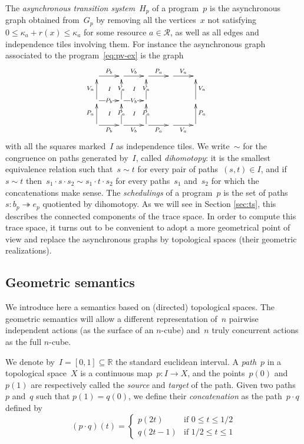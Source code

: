 \documentclass[orivec]{llncs} \usepackage[T1]{fontenc}
\newcommand{\resources}{\mathcal{R}}
\newcommand{\R}{\mathbb{R}}
\renewcommand{\P}[1]{P_{#1}}
\newcommand{\V}[1]{V_{#1}}
\newcommand{\vxym}[1]{\vcenter{\xymatrix{#1}}}
\newcommand{\capacity}[1]{\kappa_{#1}}
\newcommand{\transitionpath}[1]{\overset{#1}\twoheadrightarrow}
\renewcommand{\leq}{\leqslant}
\begin{document}
{The \emph{asynchronous transition system}~$H_p$ of a program~$p$ is the
asynchronous graph obtained from~$G_p$ by removing all the vertices~$x$ not
satisfying \hbox{$0\leq\capacity a+r(x)\leq\capacity a$} for some resource
$a\in\resources$, as well as all edges and independence tiles involving
them. For instance the asynchronous graph associated to the
program~\eqref{eq:pv-ex} is the graph
\[
\vxym{
  \ar[r]^{\P b}\ar@{}[dr]|-{I}&\ar[r]^{\V b}\ar@{}[dr]|-{I}&\ar[r]^{\P a}&\ar[r]^{\V a}&\\
  \ar[u]^{\V a}\ar[r]|{\P b}\ar@{}[dr]|-{I}&\ar[u]|{\V a}\ar[r]|{\V b}\ar@{}[dr]|-{I}&\ar[u]|{\V a}&&\ar[u]_{\V a}&\\
  \ar[u]^{\P a}\ar[r]_{\P b}&\ar[r]_{\V b}\ar[u]|{\P a}&\ar[r]_{\P a}\ar[u]|{\P a}&\ar[r]_{\V a}&\ar[u]_{\P a}&\\
}
\]
with all the squares marked~$I$ as independence tiles. We write~$\sim$ for the
congruence on paths generated by~$I$, called \emph{dihomotopy}: it is the
smallest equivalence relation such that~$s\sim t$ for every pair of
paths~$(s,t)\in I$, and if~$s\sim t$ then~$s_1\cdot s\cdot s_2 \sim s_1\cdot
t\cdot s_2$ for every paths~$s_1$ and~$s_2$ for which the concatenations make
sense. The \emph{schedulings} of a program~$p$ is the set of
paths~$s:b_p\transitionpath{}e_p$ quotiented by dihomotopy.  As we will see in
Section \ref{sec:ts}, this describes the connected components of the trace
space. In order to compute this trace space, it turns out to be convenient to
adopt a more geometrical point of view and replace the asynchronous graphs by
topological spaces (their geometric realizations).





}

\subsection{Geometric semantics}
\label{geomsem}

We introduce here a semantics based on
(directed) topological spaces. The geometric semantics will allow a
different representation of~$n$ pairwise independent actions (as the surface of
an $n$-cube) and~$n$ truly concurrent actions as the full $n$-cube.

We denote by~$I=[0,1]\subseteq\R$ the standard euclidean interval. A
\emph{path}~$p$ in a topological space~$X$ is a continuous map~$p:I\to X$, and
the points~$p(0)$ and~$p(1)$ are respectively called the \emph{source} and
\emph{target} of the path. Given two paths~$p$ and~$q$ such that $p(1)=q(0)$, we
define their \emph{concatenation} as the path~$p\cdot q$ defined by
\[
(p\cdot q)(t)=
\begin{cases}
  p(2t)&\text{if $0\leq t\leq 1/2$}\\
  q(2t-1)&\text{if $1/2\leq t\leq 1$}
\end{cases}
\]
\end{document}
